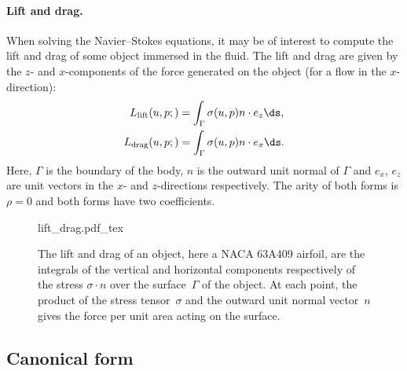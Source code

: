 \paragraph{Lift and drag.}

When solving the Navier--Stokes equations, it may be of interest to
compute the lift and drag of some object immersed in the fluid. The
lift and drag are given by the $z$- and $x$-components of the force
generated on the object (for a flow in the $x$-direction):
\begin{equation}
  \begin{split}
    L_{\mathrm{lift}}(u, p;) &= \int_{\Gamma} \sigma(u, p) n \cdot e_z \ds, \\
    L_{\mathrm{drag}}(u, p;) &= \int_{\Gamma} \sigma(u, p) n \cdot e_x \ds.
  \end{split}
\end{equation}
Here, $\Gamma$ is the boundary of the body, $n$ is the outward
unit normal of $\Gamma$ and $e_x$, $e_z$ are unit vectors
in the $x$- and $z$-directions respectively. The arity of both forms
is $\rho = 0$ and both forms have two coefficients.

\begin{figure}
  \begin{center}
    \def\svgwidth{\largefig}
    {lift_drag.pdf_tex}
    \caption{The lift and drag of an object, here a NACA 63A409
      airfoil, are the integrals of the vertical and horizontal
      components respectively of the stress $\sigma \cdot n$ over the
      surface~$\Gamma$ of the object. At each point, the product of
      the stress tensor~$\sigma$ and the outward unit normal
      vector~$n$ gives the force per unit area acting on the
      surface.}
  \end{center}
\end{figure}

\subsection{Canonical form}

